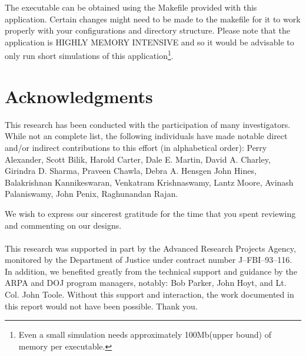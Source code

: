 The executable can be obtained using the Makefile provided with this
application. Certain changes might need to be made to the makefile for it
to work properly with your configurations and directory structure. Please
note that the application is HIGHLY MEMORY INTENSIVE and so it would be
advisable to only run short simulations of this application\footnote{Even
a small simulation needs approximately 100Mb(upper bound) of memory per
executable.}.

\newpage

\section*{Acknowledgments}
This research has been conducted with the participation of many
investigators.  While not an complete list, the following individuals
have made notable direct and/or indirect contributions to this effort
(in alphabetical order):
Perry Alexander,
Scott Bilik,
Harold Carter,
Dale E. Martin,
David A. Charley,
Girindra D. Sharma,
Praveen Chawla,
Debra A. Hensgen
John Hines,
Balakrishnan Kannikeswaran,
Venkatram Krishnaswamy,
Lantz Moore,
Avinash Palaniswamy,
John Penix,
Raghunandan Rajan.

We wish to express our sincerest gratitude for the time that you spent
reviewing and commenting on our designs.
\\
\\
This research was supported in part by the Advanced Research Projects
Agency, monitored by the Department of Justice under contract number
J--FBI--93--116.  In addition, we benefited greatly from the technical
support and guidance by the ARPA and DOJ program managers, notably: Bob
Parker, John Hoyt, and Lt. Col. John Toole.  Without this support and
interaction, the work documented in this report would not have been
possible.  Thank you.



